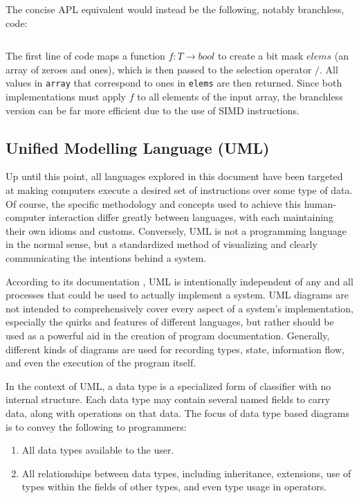 \documentclass{article}
\begin{document}
The concise APL equivalent would instead be the following, notably branchless, code:
\inputminted{apl}{linked_list/main.apl}
The first line of code maps a function $f: T \rightarrow bool$ to create a bit mask
$elems$ (an array of zeroes and ones), which is then passed to the selection operator $/$.
All values in \texttt{array} that correspond to ones in \texttt{elems} are then returned.
Since both implementations must apply $f$ to all elements of the input array, the branchless version can
be far more efficient due to the use of SIMD instructions.

\subsection{Unified Modelling Language (UML)}

Up until this point, all languages explored in this document have been targeted at making computers
execute a desired set of instructions over some type of data. Of course, the specific methodology
and concepts used to achieve this human-computer interaction differ greatly between languages,
with each maintaining their own idioms and customs. Conversely, UML is not a programming language in
the normal sense, but a standardized method of visualizing and clearly communicating the intentions behind a system.

According to its documentation \cite{uml}, UML is intentionally independent of any and all processes that could be used
to actually implement a system. UML diagrams are not intended to comprehensively cover every aspect of a system's implementation,
especially the quirks and features of different languages, but rather should be used as a powerful aid in
the creation of program documentation. Generally, different kinds of diagrams are used for recording types, state, information flow,
and even the execution of the program itself.

In the context of UML, a data type is a specialized form of classifier with no internal structure. Each data type may contain
several named fields to carry data, along with operations on that data.
The focus of data type based diagrams is to convey the following to programmers:
\begin{enumerate}
    \item All data types available to the user.
    \item All relationships between data types, including inheritance, extensions, use of types within the fields of other types,
    and even type usage in operators.
\end{enumerate}
\end{document}
